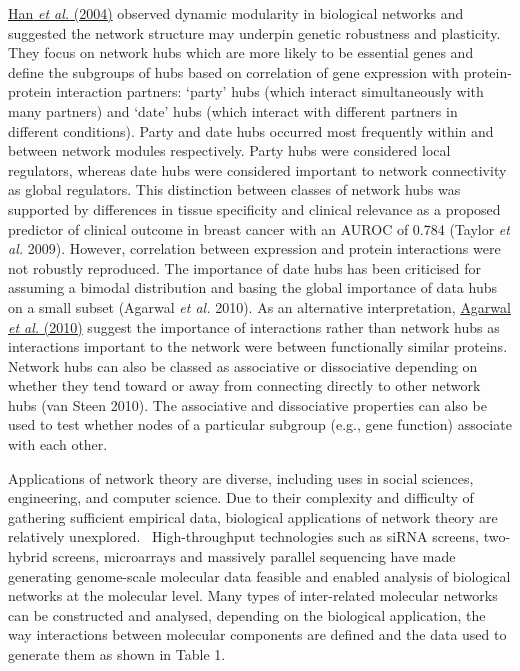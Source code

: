 \hyperlink{ENREF47}{Han}\hyperlink{ENREF47}{\textit{ et
al.}}\hyperlink{ENREF47}{ (2004)} observed dynamic modularity in
biological networks and suggested the network structure may underpin
genetic robustness and plasticity. They focus on network hubs which
are more likely to be essential genes and define the subgroups of hubs
based on correlation of gene expression with protein-protein
interaction partners: {\textquoteleft}party{\textquoteright} hubs
(which interact simultaneously with many partners) and
{\textquoteleft}date{\textquoteright} hubs (which interact with
different partners in different conditions). Party and date hubs
occurred most frequently within and between network modules
respectively. Party hubs were considered local regulators, whereas
date hubs were considered important to network connectivity as global
regulators. This distinction between classes of network hubs was
supported by differences in tissue specificity and clinical relevance
as a proposed predictor of clinical outcome in breast cancer with an
AUROC of 0.784 (Taylor\textit{ et al.} 2009). However, correlation
between expression and protein interactions were not robustly
reproduced. The importance of date hubs has been criticised for
assuming a bimodal distribution and basing the global importance of
data hubs on a small subset (Agarwal\textit{ et al.} 2010). As an
alternative interpretation,
\hyperlink{ENREF2}{Agarwal}\hyperlink{ENREF2}{\textit{ et
al.}}\hyperlink{ENREF2}{ (2010)} suggest the importance of interactions
rather than network hubs as interactions important to the network were
between functionally similar proteins. Network hubs can also be
classed as associative or dissociative depending on whether they tend
toward or away from connecting directly to other network hubs (van
Steen 2010). The associative and dissociative properties can also be
used to test whether nodes of a particular subgroup (e.g., gene
function) associate with each other. 

Applications of network theory are diverse, including uses in social
sciences, engineering, and computer science. Due to their complexity
and difficulty of gathering sufficient empirical data, biological
applications of network theory are relatively unexplored.
\ High-throughput technologies such as siRNA screens, two-hybrid
screens, microarrays and massively parallel sequencing have made
generating genome-scale molecular data feasible and enabled analysis of
biological networks at the molecular level. Many types of
inter-related molecular networks can be constructed and analysed,
depending on the biological application, the way interactions between
molecular components are defined and the data used to generate them as
shown in Table 1. 

